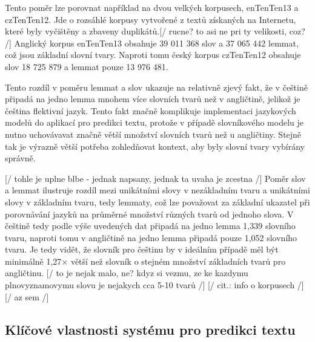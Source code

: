 \documentclass{article}
\begin{document}
Tento poměr lze porovnat například na dvou velkých korpusech, enTenTen13 a czTenTen12. Jde o rozsáhlé korpusy vytvořené z textů získaných na Internetu, které byly vyčištěny a zbaveny duplikátů.[/ rucne? to asi ne pri ty velikosti, coz? /] Anglický korpus enTenTen13 obsahuje 39 011 368 slov a 37 065 442 lemmat, což jsou základní slovní tvary. Naproti tomu český korpus czTenTen12 obsahuje slov 18 725 879 a lemmat pouze 13 976 481. 

Tento rozdíl v poměru lemmat a slov ukazuje na relativně zjevý fakt, že v češtině připadá na jedno lemma mnohem více slovních tvarů než v angličtině, jelikož je čeština flektivní jazyk. Tento fakt značně komplikuje implementaci jazykových  modelů do aplikací pro predikci textu, protože v případě slovníkového modelu je nutno uchovávavat značně větší množství slovních tvarů než u angličtiny. Stejně tak je výrazně větší potřeba zohledňovat kontext, aby byly slovní tvary vybírány správně.

[/ tohle je uplne blbe - jednak napsany, jednak ta uvaha je zcestna /]
Poměr slov a lemmat ilustruje rozdíl mezi unikátními slovy v nezákladním tvaru a unikátními slovy v základním tvaru, tedy lemmaty, což lze považovat za základní ukazatel při porovnávání jazyků na průměrné množství různých tvarů od jednoho slova. V češtině tedy podle výše uvedených dat připadá na jedno lemma 1,339 slovního tvaru, naproti tomu v angličtině na jedno lemma připadá pouze 1,052 slovního tvaru. Je tedy vidět, že slovník pro češtinu by v ideálním případě měl být minimálně 1,27× větší než slovník o stejném množství základních tvarů pro angličtinu. [/ to je nejak malo, ne? kdyz si vezmu, ze ke kazdymu plnovyznamovymu slovu je nejakych cca 5-10 tvarů /] [/ cit.: info o korpusech /]
[/ az sem /]

\subsection{Klíčové vlastnosti systému pro predikci textu}
\end{document}
